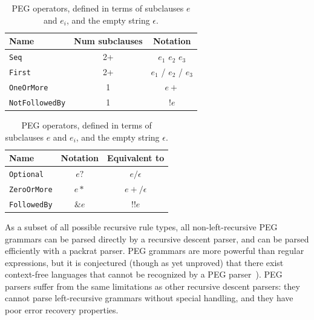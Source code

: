 \documentclass[manuscript]{acmart}
\begin{document}
\begin{table}[tbp]
    \centering
    {\small
    \begin{minipage}{0.45\textwidth}
        \centering
        \begin{tabular}{lcc}\toprule
        \textbf{Name}          & \textbf{Num subclauses} & \textbf{Notation}     \\\midrule
        \texttt{Seq}           & 2+                      & $e_1$ $e_2$ $e_3$     \\
        \texttt{First}         & 2+                      & $e_1$ / $e_2$ / $e_3$ \\
        \texttt{OneOrMore}     & 1                       & $e+$                  \\
        \texttt{NotFollowedBy} & 1                       & $!e$                  \\\bottomrule
        \end{tabular}
        \label{tab:peg_standard}
    \end{minipage}
    \hfill
    \begin{minipage}{0.45\textwidth}
        \centering
        \begin{tabular}{lcc}\toprule
        \textbf{Name}       & \textbf{Notation} & \textbf{Equivalent to} \\\midrule
        \texttt{Optional}   & $e?$              & $e / \epsilon$         \\
        \texttt{ZeroOrMore} & $e*$              & ${e+} / \epsilon$      \\
        \texttt{FollowedBy} & $\&e$             & $!!e$                  \\\bottomrule
        \end{tabular}
        \label{tab:peg_derived}
    \end{minipage}
    }
    \caption{\label{tab:peg_operators}PEG operators, defined in terms of subclauses $e$ and $e_i$, and the empty string $\epsilon$.}
\end{table}

As a subset of all possible recursive rule types, all non-left-recursive PEG grammars can be parsed directly by a recursive descent parser, and can be parsed efficiently with a packrat parser. PEG grammars are more powerful than regular expressions, but it is conjectured (though as yet unproved) that there exist context-free languages that cannot be recognized by a PEG parser~\citep{ford2004}). PEG parsers suffer from the same limitations as other recursive descent parsers: they cannot parse left-recursive grammars without special handling, and they have poor error recovery properties.
\end{document}
